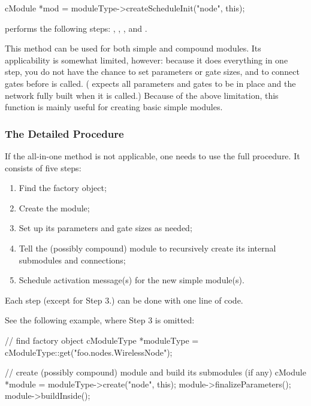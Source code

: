 \begin{ned}
\begin{cpp}
cModule *mod = moduleType->createScheduleInit("node", this);
\end{cpp}

 performs the following steps: ,
, ,
 and .

This method can be used for both simple and compound modules. Its
applicability is somewhat limited, however: because it does everything in
one step, you do not have the chance to set parameters or gate sizes, and
to connect gates before  is called.
( expects all parameters and gates to be in place and
the network fully built when it is called.) Because of the above
limitation, this function is mainly useful for creating basic simple
modules.


\subsubsection{The Detailed Procedure}
\label{sec:simple-modules:dynamic-creation:details}

If the  all-in-one method is not applicable,
one needs to use the full procedure. It consists of five steps:

\begin{enumerate}
  \item Find the factory object;
  \item Create the module;
  \item Set up its parameters and gate sizes as needed;
  \item Tell the (possibly compound) module to recursively create
        its internal submodules and connections;
  \item Schedule activation message(s) for the new simple module(s).
\end{enumerate}

Each step (except for Step 3.) can be done with one line of code.

See the following example, where Step 3 is omitted:

\begin{cpp}
// find factory object
cModuleType *moduleType = cModuleType::get("foo.nodes.WirelessNode");

// create (possibly compound) module and build its submodules (if any)
cModule *module = moduleType->create("node", this);
module->finalizeParameters();
module->buildInside();


\end{cpp}
\end{ned}
